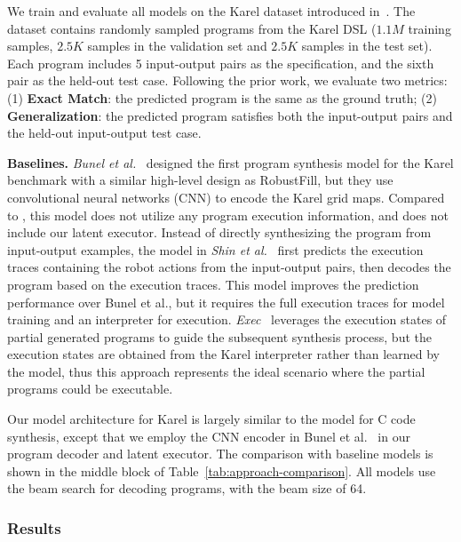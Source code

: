 We train and evaluate all models on the Karel dataset introduced in~\cite{bunel2018leveraging}. The dataset contains randomly sampled programs from the Karel DSL ($1.1M$ training samples, $2.5K$ samples in the validation set and $2.5K$ samples in the test set). Each program includes 5 input-output pairs as the specification, and the sixth pair as the held-out test case. Following the prior work, we evaluate two metrics: (1) {\bf Exact Match}: the predicted program is the same as the ground truth; (2) {\bf Generalization}: the predicted program satisfies both the input-output pairs and the held-out input-output test case.

\textbf{Baselines.} \emph{Bunel et al.}~\cite{bunel2018leveraging} designed the first program synthesis model for the Karel benchmark with a similar high-level design as RobustFill, but they use convolutional neural networks (CNN) to encode the Karel grid maps. Compared to {\ours}, this model does not utilize any program execution information, and does not include our latent executor. Instead of directly synthesizing the program from input-output examples, the model in \emph{Shin et al.}~\cite{shin2018improving} first predicts the execution traces containing the robot actions from the input-output pairs, then decodes the program based on the execution traces. This model improves the prediction performance over Bunel et al., but it requires the full execution traces for model training and an interpreter for execution. \emph{Exec}~\cite{chen2018execution} leverages the execution states of partial generated programs to guide the subsequent synthesis process, but the execution states are obtained from the Karel interpreter rather than learned by the model, thus this approach represents the ideal scenario where the partial programs could be executable.

Our model architecture for Karel is largely similar to the model for C code synthesis, except that we employ the CNN encoder in Bunel et al.~\cite{bunel2018leveraging} in our program decoder and latent executor. The comparison with baseline models is shown in the middle block of Table~\ref{tab:approach-comparison}. All models use the beam search for decoding programs, with the beam size of 64.

\vspace{-0.1in}
\subsubsection{Results}
\label{sec:karel-results}

